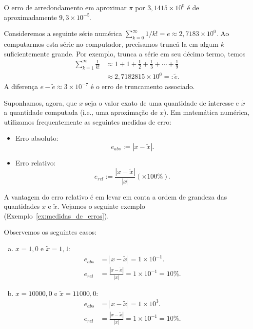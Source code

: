 \begin{ex}\label{ex:erro_de_arredondamento}
  O erro de arredondamento em aproximar $\pi$ por $3,1415\times 10^0$ é de aproximadamente $9,3\times 10^{-5}$.
\end{ex}

\begin{ex}\label{ex:erro_de_truncamento}
  Consideremos a seguinte série numérica $\sum_{k=0}^\infty 1/k! = e \approx 2,7183\times 10^0$. Ao computarmos esta série no computador, precisamos truncá-la em algum $k$ suficientemente grande. Por exemplo, trunca a série em seu décimo termo, temos
  \begin{align}
    \sum_{k=1}^\infty \frac{1}{k!} &\approx 1 + 1 + \frac{1}{2} + \frac{1}{3} + \cdots + \frac{1}{9} \\
    &\approx 2,7182815\times 10^0 =: \tilde{e}.
  \end{align}
A diferença $e - \tilde{e} \approx 3\times 10^{-7}$ é o erro de truncamento associado.
\end{ex}

Suponhamos, agora, que $x$ seja o valor exato de uma quantidade de interesse e $\tilde{x}$ a quantidade computada (i.e., uma aproximação de $x$). Em matemática numérica, utilizamos frequentemente as seguintes medidas de erro:
\begin{itemize}
  \item Erro absoluto:
    \begin{equation}
      e_{abs} := |x - \tilde{x}|.
    \end{equation}
  \item Erro relativo:
    \begin{equation}
      e_{rel} := \frac{|x - \tilde{x}|}{|x|}\left(\times 100\%\right).
    \end{equation}
\end{itemize}

A vantagem do erro relativo é em levar em conta a ordem de grandeza das quantidades $x$ e $\tilde{x}$. Vejamos o seguinte exemplo (Exemplo~\ref{ex:medidas_de_erros}).

\begin{ex}\label{ex:medidas_de_erros}
  Observemos os seguintes casos:
  \begin{enumerate}[a)]
  \item $x=1,0$ e $\tilde{x} = 1,1$:
    \begin{align}
      e_{abs} &= |x - \tilde{x}| = 1\times 10^{-1}.\\
      e_{rel} &= \frac{|x - \tilde{x}|}{|x|} = 1\times 10^{-1} = 10\%.
    \end{align}
  \item $x=10000,0$ e $\tilde{x} = 11000,0$:
    \begin{align}
      e_{abs} &= |x - \tilde{x}| = 1\times 10^3.\\
      e_{rel} &= \frac{|x - \tilde{x}|}{|x|} = 1\times 10^{-1} = 10\%.
    \end{align}
  \end{enumerate}
\end{ex}

